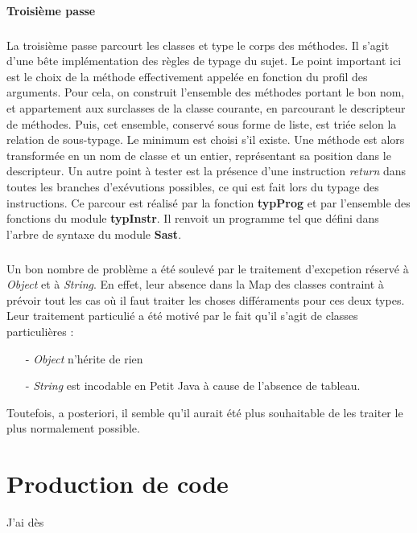 \documentclass{article}
\begin{document}
\paragraph{Troisième passe}
\subparagraph*{}
La troisième passe parcourt les classes et type le corps des méthodes. Il s'agit d'une bête implémentation des règles de typage du sujet. Le point important ici est le choix de la méthode effectivement appelée en fonction du profil des arguments. Pour cela, on construit l'ensemble des méthodes portant le bon nom, et appartement aux surclasses de la classe courante, en parcourant le descripteur de méthodes. Puis, cet ensemble, conservé sous forme de liste, est triée selon la relation de sous-typage. Le minimum est choisi s'il existe. Une méthode est alors transformée en un nom de classe et un entier, représentant sa position dans le descripteur. Un autre point à tester est la présence d'une instruction \emph{return} dans toutes les branches d'exévutions possibles, ce qui est fait lors du typage des instructions. Ce parcour est réalisé par la fonction \textbf{typProg} et par l'ensemble des fonctions du module \textbf{typInstr}. Il renvoit un programme tel que défini dans l'arbre de syntaxe du module \textbf{Sast}.

\subparagraph*{} Un bon nombre de problème a été soulevé par le traitement d'excpetion réservé à \emph{Object} et à \emph{String}. En effet, leur absence dans la Map des classes contraint à prévoir tout les cas où il faut traiter les choses différaments pour ces deux types. Leur traitement particulié a été motivé par le fait qu'il s'agit de classes particulières : 
\begin{itemize}
\item[-] \emph{Object} n'hérite de rien
\item[-] \emph{String} est incodable en Petit Java à cause de l'absence de tableau.
\end{itemize}
Toutefois, a posteriori, il semble qu'il aurait été plus souhaitable de les traiter le plus normalement possible. 

\section{Production de code}

J'ai dès
\end{document}
